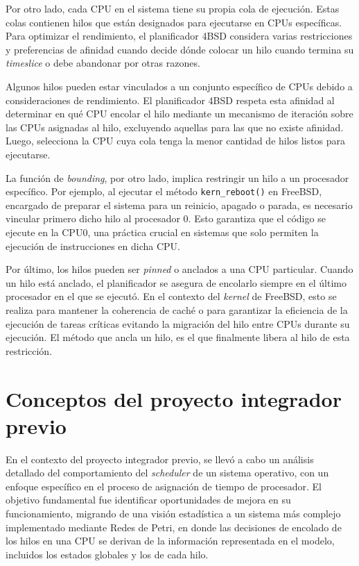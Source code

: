 Por otro lado, cada CPU en el sistema tiene su propia cola de ejecución. Estas colas contienen hilos que están designados para ejecutarse en CPUs específicas. Para optimizar el rendimiento, el planificador 4BSD considera varias restricciones y preferencias de afinidad cuando decide dónde colocar un hilo cuando termina su \textit{timeslice} o debe abandonar por otras razones.

Algunos hilos pueden estar vinculados a un conjunto específico de CPUs debido a consideraciones de rendimiento. El planificador 4BSD respeta esta afinidad al determinar en qué CPU encolar el hilo mediante un mecanismo de iteración sobre las CPUs asignadas al hilo, excluyendo aquellas para las que no existe afinidad. Luego, selecciona la CPU cuya cola tenga la menor cantidad de hilos listos para ejecutarse.\par

La función de \textit{bounding}, por otro lado, implica restringir un hilo a un procesador específico. Por ejemplo, al ejecutar el método \verb|kern_reboot()| en FreeBSD, encargado de preparar el sistema para un reinicio, apagado o parada, es necesario vincular primero dicho hilo al procesador 0. Esto garantiza que el código se ejecute en la CPU0, una práctica crucial en sistemas que solo permiten la ejecución de instrucciones en dicha CPU.\par

Por último, los hilos pueden ser \textit{pinned} o anclados a una CPU particular. Cuando un hilo está anclado, el planificador se asegura de encolarlo siempre en el último procesador en el que se ejecutó. En el contexto del \textit{kernel} de FreeBSD, esto se realiza para mantener la coherencia de caché o para garantizar la eficiencia de la ejecución de tareas críticas evitando la migración del hilo entre CPUs durante su ejecución. El método que ancla un hilo, es el que finalmente libera al hilo de esta restricción.\par

\section{Conceptos del proyecto integrador previo}

En el contexto del proyecto integrador previo, se llevó a cabo un análisis detallado del comportamiento del \textit{scheduler} de un sistema operativo, con un enfoque específico en el proceso de asignación de tiempo de procesador. El objetivo fundamental fue identificar oportunidades de mejora en su funcionamiento, migrando de una visión estadística a un sistema más complejo implementado mediante Redes de Petri, en donde las decisiones de encolado de los hilos en una CPU se derivan de la información representada en el modelo, incluidos los estados globales y los de cada hilo.\par

